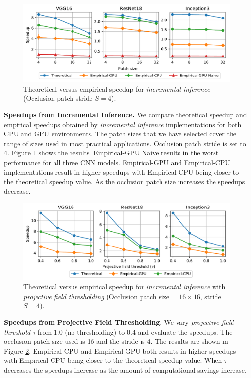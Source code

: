 \begin{figure}[t]
\includegraphics[width=\columnwidth]{images/5_2_1_edited}
\caption{Theoretical versus empirical speedup for \textit{incremental inference} (Occlusion patch stride $S=4$).}
\label{fig:5_2_1_edited}
\end{figure}

\vspace{2mm}
\noindent \textbf{Speedups from Incremental Inference.} We compare theoretical speedup and empirical speedups obtained by \textit{incremental inference} implementations for both CPU and GPU environments.
The patch sizes that we have selected cover the range of sizes used in most practical applications.
Occlusion patch stride is set to 4.
Figure \ref{fig:5_2_1_edited} shows the results.
Empirical-GPU Naive results in the worst performance for all three CNN models.
Empirical-GPU and Empirical-CPU implementations result in higher speedups with Empirical-CPU being closer to the theoretical speedup value.
As the occlusion patch size increases the speedups decrease.


\begin{figure}[t]
\includegraphics[width=\columnwidth]{images/5_2_2_edited}
\caption{Theoretical versus empirical speedup for \textit{incremental inference} with \textit{projective field thresholding} (Occlusion patch size = $16 \times 16$, stride $S=4$).}
\label{fig:5_2_2_edited}
\end{figure}

\vspace{2mm}
\noindent \textbf{Speedups from Projective Field Thresholding.} We vary \textit{projective field threshold} $\tau$ from 1.0 (no thresholding) to 0.4 and evaluate the speedups.
The occlusion patch size used is 16 and the stride is 4.
The results are shown in Figure \ref{fig:5_2_2_edited}.
Empirical-CPU and Empirical-GPU both results in higher speedups with Empirical-CPU being closer to the theoretical speedup value.
When $\tau$ decreases the speedups increase as the amount of computational savings increase.

